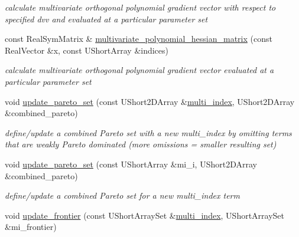 \begin{DoxyCompactItemize}
\begin{DoxyCompactList}\small\item\em calculate multivariate orthogonal polynomial gradient vector with respect to specified dvv and evaluated at a particular parameter set \end{DoxyCompactList}\item 
const Real\+Sym\+Matrix \& \hyperlink{classPecos_1_1SharedOrthogPolyApproxData_a5b9320bbcac875653a205a019c4cd18a}{multivariate\+\_\+polynomial\+\_\+hessian\+\_\+matrix} (const Real\+Vector \&x, const U\+Short\+Array \&indices)\label{classPecos_1_1SharedOrthogPolyApproxData_a5b9320bbcac875653a205a019c4cd18a}

\begin{DoxyCompactList}\small\item\em calculate multivariate orthogonal polynomial gradient vector evaluated at a particular parameter set \end{DoxyCompactList}\item 
void \hyperlink{classPecos_1_1SharedOrthogPolyApproxData_a7891e8555a3ba3a61f789f770a1c5793}{update\+\_\+pareto\+\_\+set} (const U\+Short2\+D\+Array \&\hyperlink{classPecos_1_1SharedOrthogPolyApproxData_ad93cb921a0df31fce4696f0051fe6a33}{multi\+\_\+index}, U\+Short2\+D\+Array \&combined\+\_\+pareto)\label{classPecos_1_1SharedOrthogPolyApproxData_a7891e8555a3ba3a61f789f770a1c5793}

\begin{DoxyCompactList}\small\item\em define/update a combined Pareto set with a new multi\+\_\+index by omitting terms that are weakly Pareto dominated (more omissions = smaller resulting set) \end{DoxyCompactList}\item 
void \hyperlink{classPecos_1_1SharedOrthogPolyApproxData_a00ebe33cb903007f55709cf1b73073be}{update\+\_\+pareto\+\_\+set} (const U\+Short\+Array \&mi\+\_\+i, U\+Short2\+D\+Array \&combined\+\_\+pareto)\label{classPecos_1_1SharedOrthogPolyApproxData_a00ebe33cb903007f55709cf1b73073be}

\begin{DoxyCompactList}\small\item\em define/update a combined Pareto set for a new multi\+\_\+index term \end{DoxyCompactList}\item 
void \hyperlink{classPecos_1_1SharedOrthogPolyApproxData_ab8493c41a298acac761d46a2e74c5cf2}{update\+\_\+frontier} (const U\+Short\+Array\+Set \&\hyperlink{classPecos_1_1SharedOrthogPolyApproxData_ad93cb921a0df31fce4696f0051fe6a33}{multi\+\_\+index}, U\+Short\+Array\+Set \&mi\+\_\+frontier)\label{classPecos_1_1SharedOrthogPolyApproxData_ab8493c41a298acac761d46a2e74c5cf2}


\end{DoxyCompactItemize}

